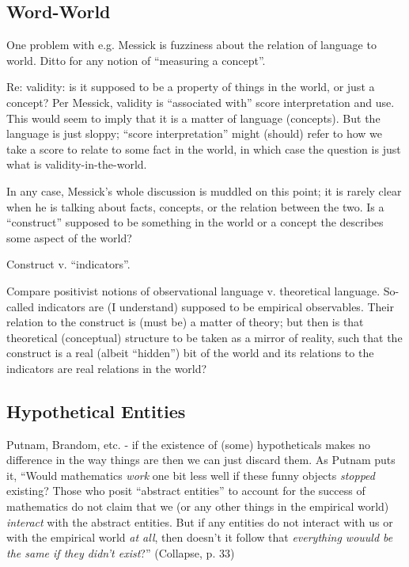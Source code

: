 \documentclass[11pt,twoside]{article}
\begin{document}
\subsection{Word-World}

One problem with e.g. Messick is fuzziness about the relation of
language to world.  Ditto for any notion of ``measuring a concept''.

Re: validity: is it supposed to be a property of things in the world,
or just a concept?  Per Messick, validity is ``associated with'' score
interpretation and use.  This would seem to imply that it is a matter
of language (concepts).  But the language is just sloppy; ``score
interpretation'' might (should) refer to how we take a score to relate
to some fact in the world, in which case the question is just what is
validity-in-the-world.

In any case, Messick's whole discussion is muddled on this point; it
is rarely clear when he is talking about facts, concepts, or the
relation between the two.  Is a ``construct'' supposed to be something
in the world or a concept the describes some aspect of the world?

Construct v. ``indicators''.

Compare positivist notions of observational language v. theoretical
language.  So-called indicators are (I understand) supposed to be
empirical observables.  Their relation to the construct is (must be) a
matter of theory; but then is that theoretical (conceptual) structure
to be taken as a mirror of reality, such that the construct is a real
(albeit ``hidden'') bit of the world and its relations to the
indicators are real relations in the world?

\subsection{Hypothetical Entities}

Putnam, Brandom, etc. - if the existence of (some) hypotheticals makes
no difference in the way things are then we can just discard them.  As
Putnam puts it, ``Would mathematics \textit{work} one bit less well if
these funny objects \textit{stopped} existing?  Those who posit
``abstract entities'' to account for the success of mathematics do not
claim that we (or any other things in the empirical world)
\textit{interact} with the abstract entities.  But if any entities do
not interact with us or with the empirical world \textit{at all}, then
doesn't it follow that \textit{everything wouuld be the same if they
  didn't exist}?'' (Collapse, p. 33)
\end{document}
